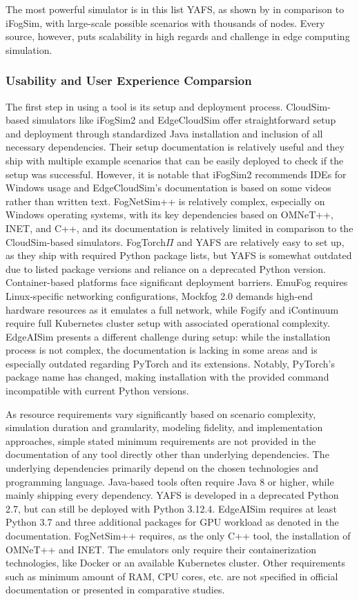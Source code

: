 The most powerful simulator is in this list YAFS, as shown by \cite{sim-yafs} in comparison to iFogSim, with large-scale possible scenarios with thousands of nodes.
Every source, however, puts scalability in high regards and challenge in edge computing simulation.

\subsubsection{Usability and User Experience Comparsion}

The first step in using a tool is its setup and deployment process.
CloudSim-based simulators like iFogSim2 and EdgeCloudSim offer straightforward setup and deployment through standardized Java installation and inclusion of all necessary dependencies.
Their setup documentation is relatively useful and they ship with multiple example scenarios that can be easily deployed to check if the setup was successful.
However, it is notable that iFogSim2 recommends IDEs for Windows usage and EdgeCloudSim's documentation is based on some videos rather than written text.
FogNetSim++ is relatively complex, especially on Windows operating systems, with its key dependencies based on OMNeT++, INET, and C++, and its documentation is relatively limited in comparison to the CloudSim-based simulators.
FogTorch$\Pi$ and YAFS are relatively easy to set up, as they ship with required Python package lists, but YAFS is somewhat outdated due to listed package versions and reliance on a deprecated Python version.
Container-based platforms face significant deployment barriers.
EmuFog requires Linux-specific networking configurations, Mockfog 2.0 demands high-end hardware resources as it emulates a full network, while Fogify and iContinuum require full Kubernetes cluster setup with associated operational complexity.
EdgeAISim presents a different challenge during setup: while the installation process is not complex, the documentation is lacking in some areas and is especially outdated regarding PyTorch and its extensions. Notably, PyTorch’s package name has changed, making installation with the provided command incompatible with current Python versions.

As resource requirements vary significantly based on scenario complexity, simulation duration and granularity, modeling fidelity, and implementation approaches, simple stated minimum requirements are not provided in the documentation of any tool directly other than underlying dependencies.
The underlying dependencies primarily depend on the chosen technologies and programming language.
Java-based tools often require Java 8 or higher, while mainly shipping every dependency.
YAFS is developed in a deprecated Python 2.7, but can still be deployed with Python 3.12.4.
EdgeAISim requires at least Python 3.7 and three additional packages for GPU workload as denoted in the documentation.
FogNetSim++ requires, as the only C++ tool, the installation of OMNeT++ and INET.
The emulators only require their containerization technologies, like Docker or an available Kubernetes cluster.
Other requirements such as minimum amount of RAM, CPU cores, etc. are not specified in official documentation or presented in comparative studies.

